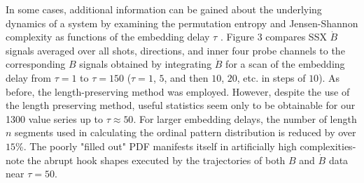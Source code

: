 \documentclass[aps,pre,twocolumn,secnumarabic,nobalancelastpage,amsmath,amssymb,
nofootinbib]{revtex4-1}
\begin{document}
In some cases, additional information can be gained about the underlying dynamics of a system by examining the permutation entropy and Jensen-Shannon complexity as functions of the embedding delay $\tau$ \cite{zunino2012}. Figure 3 compares SSX $\dot{B}$ signals averaged over all shots, directions, and inner four probe channels to the corresponding $B$ signals obtained by integrating $\dot{B}$ for a scan of the embedding delay from $\tau=1$ to $\tau=150$ ($\tau=1$, $5$, and then $10$, $20$, etc. in steps of $10$). As before, the length-preserving method was employed. However, despite the use of the length preserving method, useful statistics seem only to be obtainable for our 1300 value series up to $\tau \approx 50$. For larger embedding delays, the number of length $n$ segments used in calculating the ordinal pattern distribution is reduced by over $15$\%. The poorly "filled out" PDF manifests itself in artificially high complexities-  note the abrupt hook shapes executed by the trajectories of both $B$ and $\dot{B}$ data near $\tau=50$. 
\end{document}
